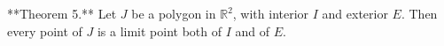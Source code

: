**Theorem 5.** Let $J$ be a polygon in $\mathbb{R}^2$, with interior $I$ and exterior $E$. Then every point of $J$ is a limit point both of $I$ and of $E$.
